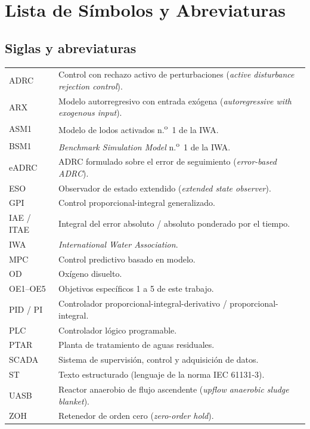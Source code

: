 \chapter*{Lista de Símbolos y Abreviaturas}

\section*{Siglas y abreviaturas}

\begin{longtable}{p{2.6cm}p{12.5cm}}
ADRC & Control con rechazo activo de perturbaciones (\textit{active disturbance rejection control}). \\
ARX & Modelo autorregresivo con entrada exógena (\textit{autoregressive with exogenous input}). \\
ASM1 & Modelo de lodos activados n.\textsuperscript{o}~1 de la IWA. \\
BSM1 & \textit{Benchmark Simulation Model} n.\textsuperscript{o}~1 de la IWA. \\
eADRC & ADRC formulado sobre el error de seguimiento (\textit{error-based ADRC}). \\
ESO & Observador de estado extendido (\textit{extended state observer}). \\
GPI & Control proporcional-integral generalizado. \\
IAE / ITAE & Integral del error absoluto / absoluto ponderado por el tiempo. \\
IWA & \textit{International Water Association}. \\
MPC & Control predictivo basado en modelo. \\
OD & Oxígeno disuelto. \\
OE1--OE5 & Objetivos específicos 1 a 5 de este trabajo. \\
PID / PI & Controlador proporcional-integral-derivativo / proporcional-integral. \\
PLC & Controlador lógico programable. \\
PTAR & Planta de tratamiento de aguas residuales. \\
SCADA & Sistema de supervisión, control y adquisición de datos. \\
ST & Texto estructurado (lenguaje de la norma IEC 61131-3). \\
UASB & Reactor anaerobio de flujo ascendente (\textit{upflow anaerobic sludge blanket}). \\
ZOH & Retenedor de orden cero (\textit{zero-order hold}). \\
\end{longtable}

